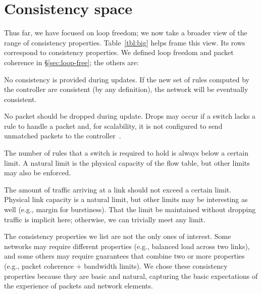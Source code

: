 \section{Consistency space}
\label{sec:table}

Thus far, we have focused on loop freedom; we now take a broader view of the range of consistency properties. Table~\ref{tbl:big} helps frame this view. Its rows correspond to consistency properties. We defined loop freedom and packet coherence in \S\ref{sec:loop-free}; the others are:

 No consistency is provided during updates. If the new set of rules computed by the controller are consistent (by any definition), the network will be eventually consistent.

 No packet should be dropped during update. Drops may occur if a switch lacks a rule to handle a packet and, for scalability, it is not configured to send unmatched packets to the controller~\cite{swan,b4}.



 The number of rules that a switch is required to hold is always below a certain limit. A natural limit is the physical capacity of the flow table, but other limits may also be enforced.

 The amount of traffic arriving at a link should not exceed a certain limit. Physical link capacity is a natural limit, but other limits may be interesting as well (e.g., margin for burstiness). That the limit be maintained without dropping traffic is implicit here; otherwise, we can trivially meet any limit.

The consistency properties we list are not the only ones of interest.
Some networks may require different properties (e.g., balanced load across two links), and some others may require  guarantees that combine two or more properties (e.g., packet coherence + bandwidth limits). We chose these consistency properties because they are basic and natural, capturing the basic expectations of the experience of packets and network elements.

